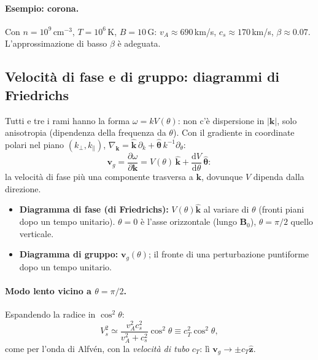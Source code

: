\paragraph{Esempio: corona.} Con $n=10^9\,\mathrm{cm^{-3}}$, $T=10^6\,$K, $B=10\,$G: $v_A\approx690\,$km/s, $c_s\approx170\,$km/s, $\beta\approx0.07$. L'approssimazione di basso $\beta$ è adeguata.

\subsection{Velocità di fase e di gruppo: diagrammi di Friedrichs}

Tutti e tre i rami hanno la forma $\omega=kV(\theta)$: non c'è dispersione in $|\mathbf{k}|$, solo anisotropia (dipendenza della frequenza da $\theta$). Con il gradiente in coordinate polari nel piano $(k_\perp,k_\parallel)$, $\nabla_{\mathbf{k}}=\hat{\mathbf{k}}\,\partial_k+\hat{\boldsymbol{\theta}}\,k^{-1}\partial_\theta$:
\begin{equation}
\mathbf{v}_g=\frac{\partial\omega}{\partial\mathbf{k}}=V(\theta)\,\hat{\mathbf{k}}+\frac{\mathrm{d}V}{\mathrm{d}\theta}\,\hat{\boldsymbol{\theta}}:
\end{equation}
la velocità di fase più una componente trasversa a $\mathbf{k}$, dovunque $V$ dipenda dalla direzione.
\begin{itemize}
\item \textbf{Diagramma di fase (di Friedrichs):} $V(\theta)\hat{\mathbf{k}}$ al variare di $\theta$ (fronti piani dopo un tempo unitario). $\theta=0$ è l'asse orizzontale (lungo $\mathbf{B}_0$), $\theta=\pi/2$ quello verticale.
\item \textbf{Diagramma di gruppo:} $\mathbf{v}_g(\theta)$; il fronte di una perturbazione puntiforme dopo un tempo unitario.
\end{itemize}

\paragraph{Modo lento vicino a $\theta=\pi/2$.} Espandendo la radice in $\cos^2\theta$:
\begin{equation}
V_s^2\simeq\frac{v_A^2c_s^2}{v_A^2+c_s^2}\cos^2\theta\equiv c_T^2\cos^2\theta,
\end{equation}
come per l'onda di Alfvén, con la \emph{velocità di tubo} $c_T$: lì $\mathbf{v}_g\to\pm c_T\hat{\mathbf{z}}$.

